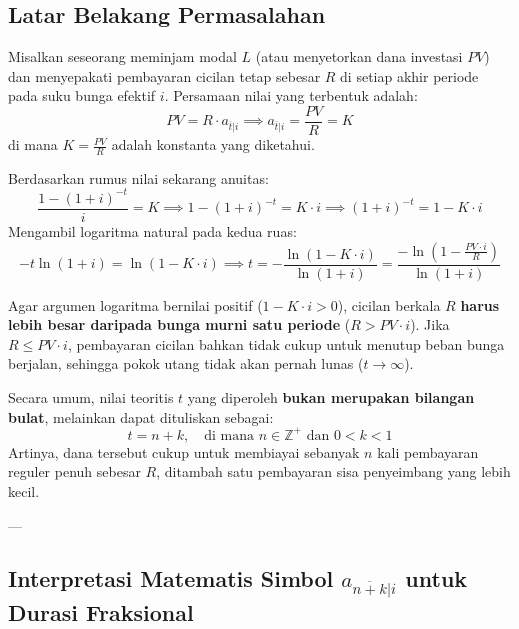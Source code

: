 \documentclass[11pt,a4paper]{article}
\begin{document}
\subsection{Latar Belakang Permasalahan}
Misalkan seseorang meminjam modal $L$ (atau menyetorkan dana investasi $PV$) dan menyepakati pembayaran cicilan tetap sebesar $R$ di setiap akhir periode pada suku bunga efektif $i$. Persamaan nilai yang terbentuk adalah:
\begin{equation}
    PV = R \cdot a_{\overline{t}|i} \implies a_{\overline{t}|i} = \frac{PV}{R} = K
\end{equation}
di mana $K = \frac{PV}{R}$ adalah konstanta yang diketahui.

Berdasarkan rumus nilai sekarang anuitas:
\begin{equation}
    \frac{1 - (1+i)^{-t}}{i} = K \implies 1 - (1+i)^{-t} = K \cdot i \implies (1+i)^{-t} = 1 - K \cdot i
\end{equation}
Mengambil logaritma natural pada kedua ruas:
\begin{equation}
    -t \ln(1+i) = \ln(1 - K \cdot i) \implies t = -\frac{\ln(1 - K \cdot i)}{\ln(1+i)} = \frac{-\ln\left(1 - \frac{PV \cdot i}{R}\right)}{\ln(1+i)}
\end{equation}

\begin{notebox}
Agar argumen logaritma bernilai positif ($1 - K \cdot i > 0$), cicilan berkala $R$ \textbf{harus lebih besar daripada bunga murni satu periode} ($R > PV \cdot i$). Jika $R \le PV \cdot i$, pembayaran cicilan bahkan tidak cukup untuk menutup beban bunga berjalan, sehingga pokok utang tidak akan pernah lunas ($t \to \infty$).
\end{notebox}

Secara umum, nilai teoritis $t$ yang diperoleh \textbf{bukan merupakan bilangan bulat}, melainkan dapat dituliskan sebagai:
\begin{equation}
    t = n + k, \quad \text{di mana } n \in \mathbb{Z}^+ \text{ dan } 0 < k < 1
\end{equation}
Artinya, dana tersebut cukup untuk membiayai sebanyak $n$ kali pembayaran reguler penuh sebesar $R$, ditambah satu pembayaran sisa penyeimbang yang lebih kecil.

---

\subsection{Interpretasi Matematis Simbol \texorpdfstring{$a_{\overline{n+k}|i}$}{a\_n+k|i} untuk Durasi Fraksional}
\end{document}
